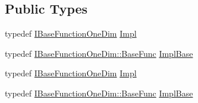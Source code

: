 \subsection*{Public Types}
\begin{DoxyCompactItemize}
\item 
typedef \mbox{\hyperlink{classROOT_1_1Math_1_1IBaseFunctionOneDim}{I\+Base\+Function\+One\+Dim}} \mbox{\hyperlink{classROOT_1_1Math_1_1Functor1D_ae7e0743edafd220a53b994cbbfbd7a9a}{Impl}}
\item 
typedef \mbox{\hyperlink{classROOT_1_1Math_1_1IBaseFunctionOneDim_a87fee465cea6b03c55aa6bc1cf641cc9}{I\+Base\+Function\+One\+Dim\+::\+Base\+Func}} \mbox{\hyperlink{classROOT_1_1Math_1_1Functor1D_a1ade2017edb7db0cbaf9a27a864f4dd3}{Impl\+Base}}
\item 
typedef \mbox{\hyperlink{classROOT_1_1Math_1_1IBaseFunctionOneDim}{I\+Base\+Function\+One\+Dim}} \mbox{\hyperlink{classROOT_1_1Math_1_1Functor1D_ae7e0743edafd220a53b994cbbfbd7a9a}{Impl}}
\item 
typedef \mbox{\hyperlink{classROOT_1_1Math_1_1IBaseFunctionOneDim_a87fee465cea6b03c55aa6bc1cf641cc9}{I\+Base\+Function\+One\+Dim\+::\+Base\+Func}} \mbox{\hyperlink{classROOT_1_1Math_1_1Functor1D_a1ade2017edb7db0cbaf9a27a864f4dd3}{Impl\+Base}}
\end{DoxyCompactItemize}
